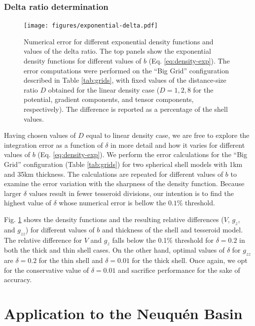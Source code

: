 \documentclass[extra, referee]{gji}
\begin{document}
\subsubsection{Delta ratio determination}

\begin{figure}
\centering
\texttt{[image: figures/exponential-delta.pdf]}
\caption{
    Numerical error for different exponential density functions and values of the delta
    ratio.
    The top panels show the exponential density functions for different values of $b$
    (Eq. \ref{eq:density-exp}).
    The error computations were performed on the ``Big Grid'' configuration described in
    Table \ref{tab:grids}, with fixed values of the distance-size ratio
    $D$ obtained for the linear density case ($D=1, 2, 8$ for the
    potential, gradient components, and tensor components, respectively).
    The difference is reported as a percentage of the shell values.
    }
\label{fig:delta-exponential}
\end{figure}

Having chosen values of $D$ equal to linear density case, we are free to explore the
integration error as a function of $\delta$ in more detail and how it varies for
different values of $b$ (Eq. \ref{eq:density-exp}).
We perform the error calculations for the ``Big Grid'' configuration (Table
\ref{tab:grids}) for two spherical shell models with 1km and 35km thickness.
The calculations are repeated for different values of $b$ to examine the error variation
with the sharpness of the density function.
Because larger $\delta$ values result in fewer tesseroid divisions,
our intention is to find the highest value of $\delta$ whose numerical error is bellow
the $0.1\%$ threshold.

Fig. \ref{fig:delta-exponential} shows the density functions and the resulting relative
differences ($V$, $g_z$, and $g_{zz}$) for different values of $b$ and thickness of the
shell and tesseroid model.
The relative difference for $V$ and $g_z$ falls below the 0.1\% threshold for
$\delta = 0.2$ in both the thick and thin shell cases.
On the other hand, optimal values of $\delta$ for $g_{zz}$
are $\delta = 0.2$ for the thin shell and $\delta = 0.01$ for the thick shell.
Once again, we opt for the conservative value of $\delta = 0.01$ and sacrifice
performance for the sake of accuracy.



\section{Application to the Neuqu\'en Basin}
\end{document}
